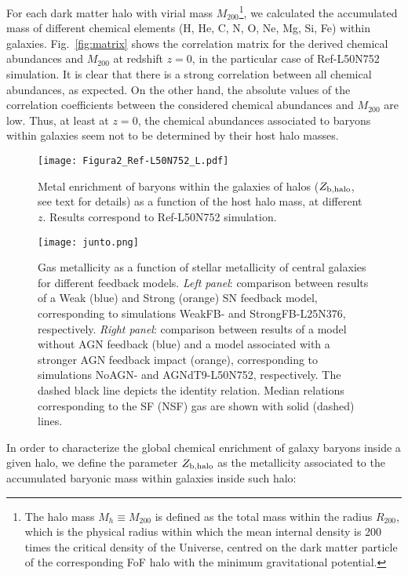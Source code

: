\documentclass[baaa]{baaa}
\begin{document}
For each dark matter halo with virial mass $M_{200}$\footnote{The halo mass $M_h \equiv M_{200}$ is defined as the total mass within the radius $R_{200}$, which is the physical radius within which the mean internal density is 200 times the critical density of the Universe, centred on the dark matter particle of the corresponding {\sc FoF} halo with the minimum gravitational potential.}, we calculated the accumulated mass of different chemical elements (H, He, C, N, O, Ne, Mg, Si, Fe) within galaxies. Fig.~\ref{fig:matrix} shows the correlation matrix for the derived chemical abundances and $M_{200}$ at redshift $z=0$, in the particular case of Ref-L50N752 simulation.
It is clear that there is a strong correlation between all chemical abundances, as expected. On the other hand, the  absolute values of the correlation coefficients between the considered chemical abundances and $M_{200}$ are low. Thus, at least at $z=0$, the chemical abundances associated to baryons within galaxies seem not to be determined by their host halo masses.


\begin{figure}[!t]
\centering
\texttt{[image: Figura2\_Ref-L50N752\_L.pdf]}
	\caption{Metal enrichment of baryons within the galaxies of halos ($Z_{\rm b,halo}$, see text for details) as a function of the host halo mass, at different $z$. Results correspond to Ref-L50N752 simulation.}
\label{fig:evolution}
\end{figure}

\begin{figure*}[!t]
\centering
\texttt{[image: junto.png]}
	\caption{Gas metallicity as a function of stellar metallicity of central galaxies for different feedback models. \emph{Left panel}: comparison between results of a Weak (blue) and Strong (orange) SN feedback model, corresponding to simulations WeakFB- and StrongFB-L25N376, respectively. \emph{Right panel}: comparison between results of a model without AGN feedback (blue) and a model associated with a stronger AGN feedback impact (orange), corresponding to simulations NoAGN- and AGNdT9-L50N752, respectively. The dashed black line depicts the identity relation. Median relations corresponding to the SF (NSF) gas are shown with solid (dashed) lines.}
\label{fig:feedback}
\end{figure*}

In order to characterize the global chemical enrichment of galaxy baryons inside a given halo, we define the parameter $Z_{\rm b,halo}$ as the metallicity associated to the accumulated baryonic mass within galaxies inside such halo:
\end{document}
